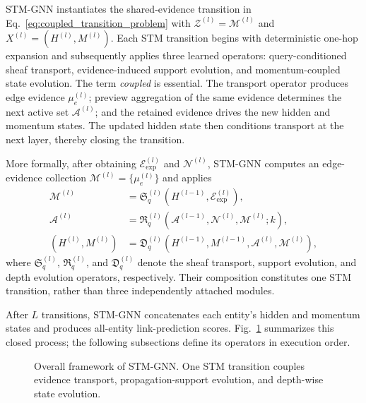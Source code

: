 \documentclass[a4paper,fleqn]{cas-sc}
\begin{document}
STM-GNN instantiates the shared-evidence transition in
Eq.~\eqref{eq:coupled_transition_problem} with
$\mathcal{Z}^{(l)}=\mathcal{M}^{(l)}$ and
$X^{(l)}=(H^{(l)},M^{(l)})$. Each STM transition begins with deterministic
one-hop expansion and subsequently applies three learned operators:
query-conditioned sheaf transport, evidence-induced support evolution, and
momentum-coupled state evolution. The term \emph{coupled} is essential. The
transport operator produces edge evidence $\mu_e^{(l)}$; preview aggregation of
the same evidence determines the next active set $\mathcal{A}^{(l)}$; and the
retained evidence drives the new hidden and momentum states. The updated hidden
state then conditions transport at the next layer, thereby closing the
transition.

More formally, after obtaining $\mathcal{E}_{\mathrm{exp}}^{(l)}$ and
$\mathcal{N}^{(l)}$, STM-GNN computes an edge-evidence collection
$\mathcal{M}^{(l)}=\{\mu_e^{(l)}\}$ and applies
\begin{equation}
\begin{aligned}
\mathcal{M}^{(l)}
&=\mathfrak{S}_{q}^{(l)}
\left(H^{(l-1)},\mathcal{E}_{\mathrm{exp}}^{(l)}\right),\\
\mathcal{A}^{(l)}
&=\mathfrak{R}_{q}^{(l)}
\left(\mathcal{A}^{(l-1)},\mathcal{N}^{(l)},
\mathcal{M}^{(l)};k\right),\\
\left(H^{(l)},M^{(l)}\right)
&=\mathfrak{D}_{q}^{(l)}
\left(H^{(l-1)},M^{(l-1)},
\mathcal{A}^{(l)},\mathcal{M}^{(l)}\right),
\end{aligned}
\label{eq:stm_decomposition}
\end{equation}
where $\mathfrak{S}_{q}^{(l)}$, $\mathfrak{R}_{q}^{(l)}$, and
$\mathfrak{D}_{q}^{(l)}$ denote the sheaf transport, support evolution, and
depth evolution operators, respectively. Their composition constitutes one STM
transition, rather than three independently attached modules.

After $L$ transitions, STM-GNN concatenates each entity's hidden and momentum
states and produces all-entity link-prediction scores. Fig.~\ref{fig:overall_framework}
summarizes this closed process; the following subsections define its operators
in execution order.

\begin{figure}[pos=htbp]
\centering
{}
\caption{Overall framework of STM-GNN. One STM transition couples evidence
transport, propagation-support evolution, and depth-wise state evolution.}
\label{fig:overall_framework}
\end{figure}
\FloatBarrier
\end{document}
